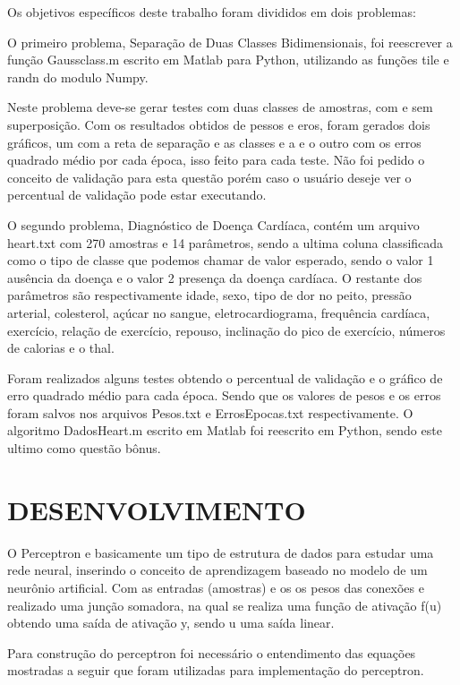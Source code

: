 \documentclass[
12pt, 
a4paper,
oneside,			%
english,			%
french,				%
spanish,			%
brazil,	
]{abntex2}
\begin{document}
	Os objetivos específicos deste trabalho foram divididos em dois problemas:
	
	O primeiro problema, Separação de Duas Classes Bidimensionais, foi reescrever a função Gaussclass.m escrito em Matlab para Python, utilizando as funções tile e randn do modulo Numpy. 
	
	Neste problema deve-se gerar testes com duas classes de amostras, com e sem superposição. Com os resultados obtidos de pessos e eros, foram gerados dois gráficos, um com a reta de separação e as classes e a  e o outro com os erros quadrado médio por cada época, isso feito para cada teste. Não foi pedido o conceito de validação para esta questão porém caso o usuário deseje ver o percentual de validação pode estar executando. 
	
	O segundo problema, Diagnóstico de Doença Cardíaca, contém um arquivo heart.txt com 270 amostras e 14 parâmetros, sendo a ultima coluna classificada como o  tipo de classe que podemos chamar de valor esperado, sendo o valor 1 ausência da doença e o valor 2 presença da doença cardíaca. O restante dos parâmetros são respectivamente idade, sexo, tipo de dor no peito, pressão arterial, colesterol, açúcar no sangue, eletrocardiograma, frequência cardíaca, exercício, relação de exercício, repouso, inclinação do pico de exercício, números de calorias e o thal.
	
	Foram realizados alguns testes obtendo o percentual de  validação e o gráfico de erro quadrado médio para cada época. Sendo que os valores de pesos e os erros foram salvos nos arquivos Pesos.txt e ErrosEpocas.txt respectivamente. O algoritmo DadosHeart.m escrito em Matlab foi reescrito em Python, sendo este ultimo como questão bônus.  
	
		
	\chapter{DESENVOLVIMENTO}
	O Perceptron e basicamente um tipo de estrutura de dados para estudar uma rede neural, inserindo o conceito de aprendizagem baseado no modelo de um neurônio artificial. Com as entradas (amostras) e os os pesos das conexões e realizado uma junção somadora, na qual se realiza uma função de ativação f(u) obtendo uma saída de ativação y, sendo u uma saída linear.  
	
	Para construção do perceptron foi necessário o entendimento das equações mostradas a seguir que foram utilizadas para implementação do perceptron. \cite{perceptron}\cite{redes}
	
\end{document}
